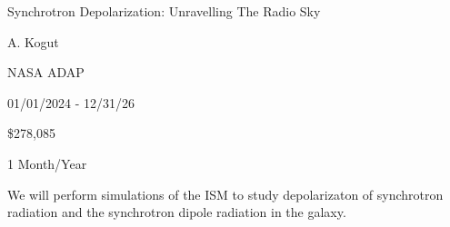 
 Synchrotron Depolarization: Unravelling The Radio Sky

 A. Kogut

 NASA ADAP

 01/01/2024 - 12/31/26

 \$278,085

 1 Month/Year

We will perform simulations of the ISM to study depolarizaton of synchrotron
radiation and the synchrotron dipole radiation in the galaxy.
